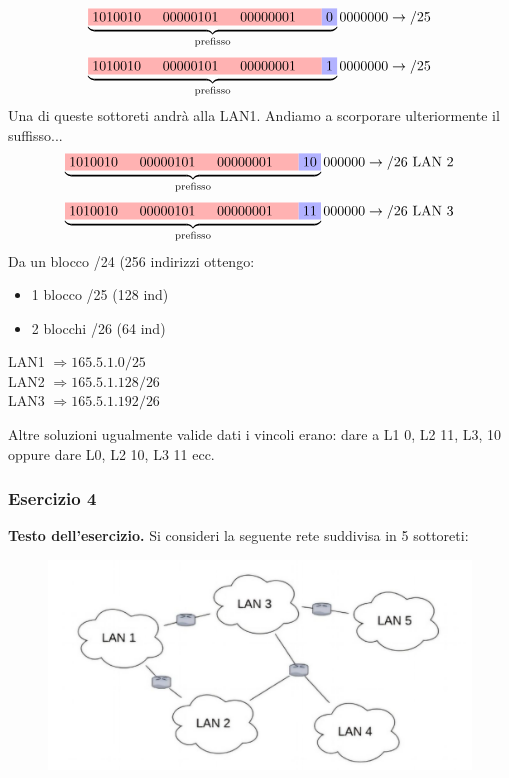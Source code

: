 \documentclass[a4paper]{article}
\begin{document}
\[\underbrace{\colorbox{red!30!white}{1010010 \; \; 00000101 \; \; 00000001 \; \; }\colorbox{blue!30!white}{0}}_{\text{prefisso}}0000000 \rightarrow /25\]
\[\underbrace{\colorbox{red!30!white}{1010010 \; \; 00000101 \; \; 00000001 \; \; }\colorbox{blue!30!white}{1}}_{\text{prefisso}}0000000 \rightarrow /25\]
Una di queste sottoreti andrà alla LAN1. Andiamo a scorporare ulteriormente il suffisso...
\[\underbrace{\colorbox{red!30!white}{1010010 \; \; 00000101 \; \; 00000001 \; \; }\colorbox{blue!30!white}{10}}_{\text{prefisso}}000000 \rightarrow /26 \text{ LAN 2}\]
\[\underbrace{\colorbox{red!30!white}{1010010 \; \; 00000101 \; \; 00000001 \; \; }\colorbox{blue!30!white}{11}}_{\text{prefisso}}000000 \rightarrow /26 \text{ LAN 3}\]
Da un blocco /24 (256 indirizzi ottengo:
\begin{itemize}
    \item 1 blocco /25 (128 ind)
    \item 2 blocchi /26 (64 ind)
\end{itemize}
\begin{center}
    LAN1 $\Longrightarrow 165.5.1.0/25$\\
    LAN2 $\Longrightarrow 165.5.1.128/26$\\
    LAN3 $\Longrightarrow 165.5.1.192/26$\\
\end{center}
Altre soluzioni ugualmente valide dati i vincoli erano: dare a L1 0, L2 11, L3, 10 oppure dare L0, L2 10, L3 11 ecc.
\subsubsection{Esercizio 4}

\textbf{Testo dell'esercizio.} Si consideri la seguente rete suddivisa in 5 sottoreti:

\begin{figure}[H]
    \centering
    \includegraphics[width=1\textwidth]{Esercizio1.png}
    \label{fig:centered-image}
\end{figure}
\end{document}
